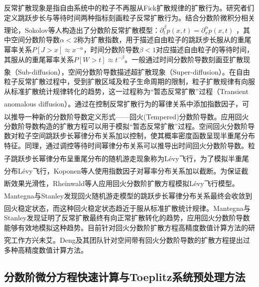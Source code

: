 \documentclass[twoside,UTF8]{nputhesis}
\newcommand{\upcite}[1]{\textsuperscript{\textsuperscript{\cite{#1}}}}
\begin{document}
反常扩散现象是指自由系统中的粒子不再服从Fick扩散规律的扩散行为。研究者们定义跳跃步长与等待时间两种指标刻画粒子反常扩散行为。结合分数阶微积分相关理论，Sokolov等人\upcite{klafter2005anomalous}构造出了分数阶反常扩散模型：$\partial _{t}^{\beta }p(x,t)=\partial _{x}^{\alpha }p(x,t)$ ，其中空间分数阶导数$\alpha<2$称为扩散指数，用于描述自由粒子的跳跃步长服从的重尾幂率关系$P[J>x]\approx {{x}^{-\alpha }}$，时间分数阶导数$\beta <1$对应描述自由粒子的等待时间，其服从的重尾幂率关系$P[W>t]\approx {{t}^{-\beta }}$。一般通过时间分数阶导数刻画亚扩散现象（Sub-diffusion），空间分数阶导数描述超扩散现象（Super-diffusion）\upcite{sabzikar2015tempered}。在自由粒子反常扩散过程中，受到扩散区域及粒子生命周期的限制，粒子扩散规律有向服从标准扩散统计规律转化的趋势，这一过程称为“暂态反常扩散”过程（Transient anomalous diffusion）\upcite{bronstein2009transient}。通过在控制反常扩散行为的幂律关系中添加指数因子，可以推导一种新的分数阶导数定义形式——回火(Tempered)分数阶导数\upcite{baeumer2010tempered}。应用回火分数阶导数构造的扩散方程可以用于模拟“暂态反常扩散”过程。空间回火分数阶导数对粒子空间跳跃步长幂律分布关系加以控制，使其概率密度函数呈现半重尾分布特征。同理，通过调控等待时间幂律分布关系可以推导出时间回火分数阶导数。粒子跳跃步长幂律分布呈重尾分布的随机游走现象称为Lévy飞行\upcite{mandelbrot1983fractal, metzler2004restaurant, meerschaert2008tempered}，为了模拟半重尾分布Lévy飞行，Koponen等人\upcite{koponen1995analytic}使用指数因子对幂率分布关系加以截断。为保证截断效果光滑性，Rheinwald等人\upcite{rheinwald1973transmissible}应用回火分数阶扩散方程模拟Lévy飞行模型。Mantegna与Stanley\upcite{mantegna1994stochastic}发现回火随机游走模型的跳跃步长幂律分布关系最终会收敛到回火稳定状态，而这种回火稳定状态趋近于服从标准扩散统计规律\upcite{barndorff1997processes}。Mantegna与Stanley发现证明了反常扩散最终有向正常扩散转化的趋势，应用回火分数阶导数能够有效地模拟这种趋势。目前针对回火分数阶扩散方程高精度数值计算方法的研究工作方兴未艾\upcite{li2016high}。Deng及其团队\upcite{li2016high, yu2017third, dehghan2017fourth}针对空间带有回火分数阶导数的扩散方程提出过多种高精度数值计算方法。


\subsection{分数阶微分方程快速计算与Toeplitz系统预处理方法}
\end{document}
